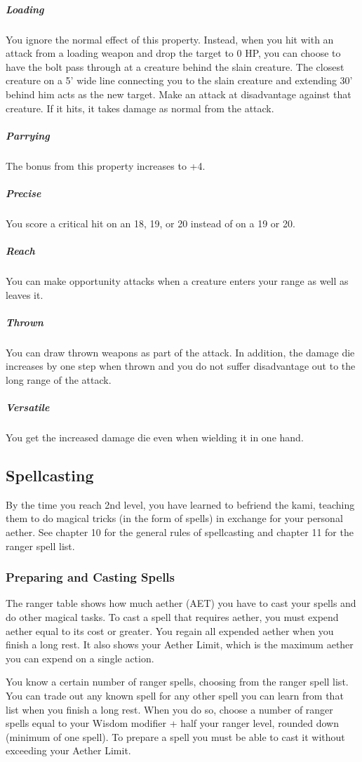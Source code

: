 \subparagraph*{Loading} You ignore the normal effect of this property. Instead, when you hit with an attack from a loading weapon and drop the target to 0 HP, you can choose to have the bolt pass through at a creature behind the slain creature. The closest creature on a 5' wide line connecting you to the slain creature and extending 30' behind him acts as the new target. Make an attack at disadvantage against that creature. If it hits, it takes damage as normal from the attack.

\subparagraph*{Parrying} The bonus from this property increases to +4.

\subparagraph*{Precise} You score a critical hit on an 18, 19, or 20 instead of on a 19 or 20.

\subparagraph*{Reach} You can make opportunity attacks when a creature enters your range as well as leaves it.

\subparagraph*{Thrown} You can draw thrown weapons as part of the attack. In addition, the damage die increases by one step when thrown and you do not suffer disadvantage out to the long range of the attack.

\subparagraph*{Versatile} You get the increased damage die even when wielding it in one hand.

\subsection{Spellcasting}

By the time you reach 2nd level, you have learned to befriend the kami, teaching them to do magical tricks (in the form of spells) in exchange for your personal aether. See chapter 10 for the general rules of spellcasting and chapter 11 for the ranger spell list.

\subsubsection{Preparing and Casting Spells}

The ranger table shows how much aether (AET) you have to cast your spells and do other magical tasks. To cast a spell that requires aether, you must expend aether equal to its cost or greater. You regain all expended aether when you finish a long rest. It also shows your Aether Limit, which is the maximum aether you can expend on a single action.

You know a certain number of ranger spells, choosing from the ranger spell list. You can trade out any known spell for any other spell you can learn from that list when you finish a long rest. When you do so, choose a number of ranger spells equal to your Wisdom modifier + half your ranger level, rounded down (minimum of one spell). To prepare a spell you must be able to cast it without exceeding your Aether Limit.

